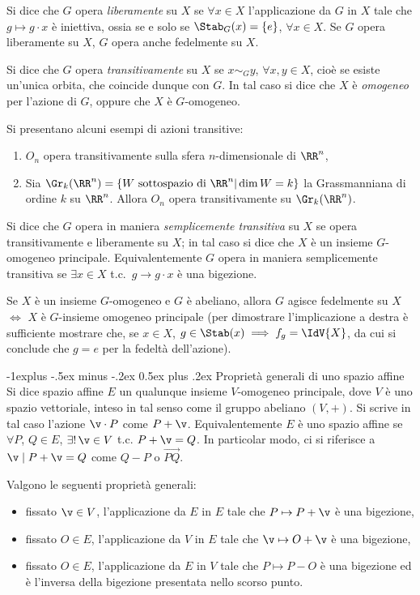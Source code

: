 \documentclass[10pt,landscape]{article}
\makeatletter
\renewcommand{\subsection}{\@startsection{subsection}{2}{0mm}%
	{-1explus -.5ex minus -.2ex}%
	{0.5ex plus .2ex}%
	{\normalfont\normalsize\bfseries}}
\makeatother
\begin{document}
\begin{multicols}{3}
		Si dice che $G$ opera \textit{liberamente} su $X$ se $\forall x \in X$ l'applicazione
		da $G$ in $X$ tale che $g \mapsto g \cdot x$ è iniettiva, ossia se e solo se $\Stab_G(x)=\{e\}$, $\forall x \in X$. Se $G$ opera liberamente su $X$,
		$G$ opera anche fedelmente su $X$.
		
		Si dice che $G$ opera \textit{transitivamente }su $X$ se $x \sim_G y$, $\forall x,y \in X$, cioè se esiste un'unica orbita, che coincide dunque con $G$. In tal caso
		si dice che $X$ è \textit{omogeneo} per l'azione di $G$, oppure che
		$X$ è $G$-omogeneo.
		
		Si presentano alcuni esempi di azioni transitive:
		\begin{enumerate}
			\item $O_n$ opera transitivamente sulla sfera $n$-dimensionale di $\RR^n$,
			\item Sia $\Gr_k(\RR^n)=\{W \text{ sottospazio di } \RR^n | \dim W=k\}$ la Grassmanniana di ordine $k$ su $\RR^n$. Allora $O_n$ opera transitivamente su $\Gr_k(\RR^n)$.
		\end{enumerate}
		
		Si dice che $G$ opera in maniera \textit{semplicemente transitiva} su $X$ se opera transitivamente e liberamente su $X$; in tal caso si dice che $X$ è un insieme $G$-omogeneo principale. Equivalentemente $G$ opera in maniera semplicemente transitiva se $\exists x\in X$ t.c.~$g\rightarrow g \cdot x$ è una bigezione.
		
		Se $X$ è un insieme $G$-omogeneo e $G$ è abeliano, allora $G$ agisce fedelmente su $X$ $\iff$ $X$ è $G$-insieme omogeneo principale (per dimostrare l'implicazione a destra è sufficiente mostrare che, se $x \in X$, $g \in \Stab(x) \implies f_g = \IdV{X}$, da cui si conclude
		che $g = e$ per la fedeltà dell'azione).
		
		\subsection{Proprietà generali di uno spazio affine}
		Si dice spazio affine $E$ un qualunque insieme $V$-omogeneo principale, dove
		$V$ è uno spazio vettoriale, inteso in tal senso come il gruppo abeliano
		$(V, +)$. Si scrive in tal caso l'azione $\v \cdot P$ come $P + \v$. Equivalentemente $E$ è uno spazio affine se $\forall P$, $Q \in E$, $\exists! \, \v\in V$ t.c. $P + \v = Q$. In particolar modo, ci si riferisce a $\v \mid P + \v = Q$ come $Q - P$ o
		$\overrightarrow{PQ}$.
		
		Valgono le seguenti proprietà generali:
		\begin{itemize}
			\item fissato $\v \in V$, l'applicazione da $E$ in $E$ tale che $P \mapsto P+\v$ è una bigezione,
			\item fissato $O \in E$, l'applicazione da $V$ in $E$ tale che $\v \mapsto O+\v$ è una bigezione,
			\item fissato $O \in E$, l'applicazione da $E$ in $V$ tale che $P \mapsto P-O$ è una bigezione ed è l'inversa della bigezione presentata nello scorso punto.
		\end{itemize}
		

\end{multicols}
\end{document}
